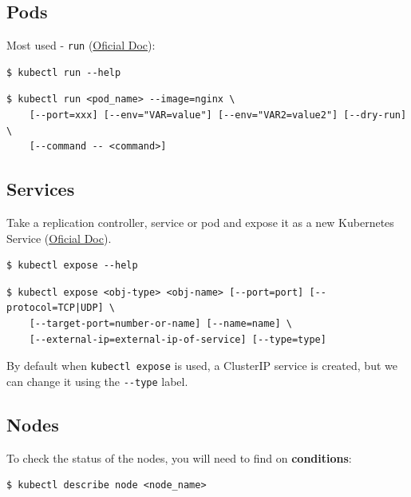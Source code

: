 \documentclass{article}
\newenvironment{blocktemplate}[1]{%
    \tcolorbox[beamer,%
    noparskip,breakable,
    colframe=Blue,%
    colbacklower=LimeGreen!75!LightGreen,%
    title=#1]}%
    {\endtcolorbox}
\newenvironment{codetemplate}[1][]{%
  \mybasecolorbox[#1]
  \itshape
}{%
  \endmybasecolorbox
}
\begin{document}
\subsection{Pods}
Most used - \verb|run| (\href{https://jamesdefabia.github.io/docs/user-guide/kubectl/kubectl_run/}{Oficial Doc}):
\begin{codetemplate}{}
\begin{verbatim}
$ kubectl run --help
\end{verbatim}
\end{codetemplate}
\begin{codetemplate}
\begin{verbatim}
$ kubectl run <pod_name> --image=nginx \
    [--port=xxx] [--env="VAR=value"] [--env="VAR2=value2"] [--dry-run] \
    [--command -- <command>]
\end{verbatim}
\end{codetemplate}

\subsection{Services}
Take a replication controller, service or pod and expose it as a new Kubernetes Service (\href{https://jamesdefabia.github.io/docs/user-guide/kubectl/kubectl_expose/}{Oficial Doc}).

\begin{codetemplate}{}
\begin{verbatim}
$ kubectl expose --help
\end{verbatim}
\end{codetemplate}
\begin{codetemplate}{}
\begin{verbatim}
$ kubectl expose <obj-type> <obj-name> [--port=port] [--protocol=TCP|UDP] \
    [--target-port=number-or-name] [--name=name] \
    [--external-ip=external-ip-of-service] [--type=type]
\end{verbatim}
\end{codetemplate}

\begin{blocktemplate}{NOTE}
By default when \verb|kubectl expose| is used, a ClusterIP service is created, but we can change it using the \verb|--type| label.
\end{blocktemplate}

\subsection{Nodes}
To check the status of the nodes, you will need to find on \textbf{conditions}:
\begin{codetemplate}
\begin{verbatim}
$ kubectl describe node <node_name>
\end{verbatim}
\end{codetemplate}
\end{document}
